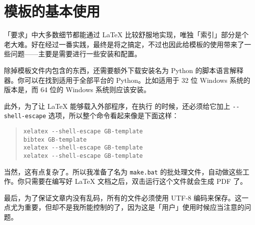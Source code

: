 \chapter{模板的基本使用}
「要求」中大多数细节都能通过 \LaTeX{} 比较舒服地实现，唯独「索引」部分是个老大难。好在经过一番实践，最终是将之搞定，不过也因此给模板的使用带来了一些问题——主要是需要进行一些安装和配置。

除掉模板文件内包含的东西，还需要额外下载安装名为 Python 的脚本语言解释器。你可以在\href{https://www.python.org/ftp/python/2.7.6/}{}找到适用于全部平台的 Python。比如适用于 32 位 Windows 系统的版本是\href{https://www.python.org/ftp/python/2.7.6/python-2.7.6.msi}{}，而 64 位的 Windows 系统则应该安装\href{https://www.python.org/ftp/python/2.7.6/python-2.7.6.amd64.msi}{}。

此外，为了让 \LaTeX{} 能够载入外部程序，在执行  的时候，还必须给它加上 \verb|--shell-escape| 选项，所以整个命令看起来像是下面这样：

\begin{quote}
\begin{verbatim}
xelatex --shell-escape GB-template
bibtex GB-template
xelatex --shell-escape GB-template
xelatex --shell-escape GB-template
\end{verbatim}
\end{quote}

当然，这有点复杂了。所以我准备了名为 \verb|make.bat| 的批处理文件，自动做这些工作。你只需要在编写好 \LaTeX{} 文档之后，双击运行这个文件就会生成 PDF 了。

最后，为了保证文章内没有乱码，所有的文件必须使用 UTF-8 编码来保存。这一点尤为重要，但却不是我所能控制的了，因为这是「用户」使用时候应当注意的问题。
